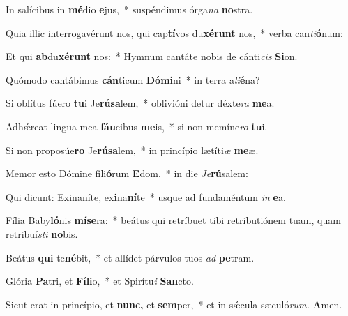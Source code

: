 \item In salícibus in \textbf{mé}dio \textbf{e}jus,~* suspéndimus órga\tinyhspace\textit{na} \textbf{no}stra.
\item Quia illic interrogavérunt nos, qui cap\textbf{tí}vos du\textbf{xé}\textbf{runt} nos,~* verba can\textit{ti}\textbf{ó}num:
\item Et qui \textbf{ab}du\textbf{xé}\textbf{runt} nos:~* Hymnum cantáte nobis de cánti\tinyhspace\textit{cis} \textbf{Si}on.
\item Quómodo cantábimus \textbf{cán}ticum \textbf{Dó}\textbf{mi}ni~* in terra a\hspace{0.04em}\textit{li}\textbf{é}na?
\item Si oblítus fúero \textbf{tu}i Je\textbf{rú}\textbf{sa}lem,~* oblivióni detur déxte\tinyhspace\textit{ra} \textbf{me}a.
\item Adhǽreat lingua mea \textbf{fáu}cibus \textbf{me}is,~* si non memíne\tinyhspace\textit{ro} \textbf{tu}i.
\item Si non proposúe\textbf{ro} Je\textbf{rú}\textbf{sa}lem,~* in princípio lætíti\tinyhspace\textit{æ} \textbf{me}æ.
\item Memor esto Dómine fili\textbf{ó}rum \textbf{E}dom,~* in die \tinyhspace\textit{Je}\textbf{rú}salem:
\item Qui dicunt: Exinaníte, ex\textbf{i}na\textbf{ní}te~* usque ad fundaméntum \textit{in} \textbf{e}a.
\item Fília Baby\textbf{ló}nis \textbf{mí}\textbf{se}ra:~* beátus qui retríbuet tibi retributiónem tuam, quam retribuí\hspace{0.04em}\textit{sti} \textbf{no}bis.
\item Beátus \textbf{qui} te\textbf{né}bit,~* et allídet párvulos tuos \textit{ad} \textbf{pe}tram.
\item Glória \textbf{Pa}tri, et \textbf{Fí}\textbf{li}o,~* et Spirítu\tinyhspace\textit{i} \textbf{San}cto.
\item Sicut erat in princípio, et \textbf{nunc,} et \textbf{sem}per,~* et in sǽcula sæculó\textit{rum.} \textbf{A}men.